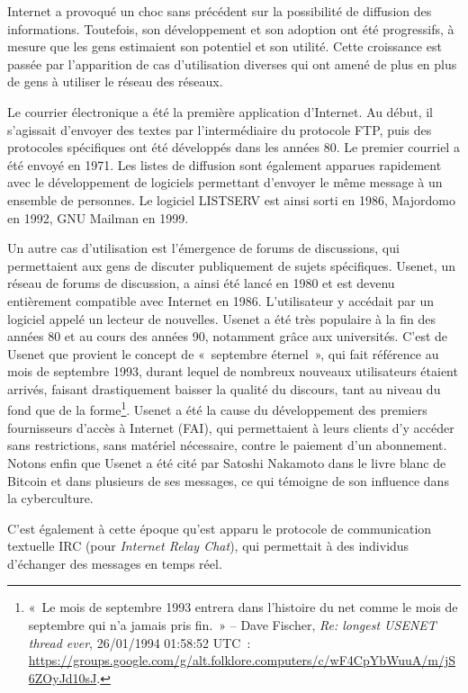 \documentclass[
  a5paper,
  smalldemyvopaper,10pt,twoside,onecolumn,openright,extrafontsizes,hidelinks]{memoir}
\begin{document}
Internet a provoqué un choc sans précédent sur la possibilité de
diffusion des informations. Toutefois, son développement et son adoption
ont été progressifs, à mesure que les gens estimaient son potentiel et
son utilité. Cette croissance est passée par l'apparition de cas
d'utilisation diverses qui ont amené de plus en plus de gens à utiliser
le réseau des réseaux.

Le courrier électronique a été la première application d'Internet. Au
début, il s'agissait d'envoyer des textes par l'intermédiaire du
protocole FTP, puis des protocoles spécifiques ont été développés dans
les années 80. Le premier courriel a été envoyé en 1971. Les listes de
diffusion sont également apparues rapidement avec le développement de
logiciels permettant d'envoyer le même message à un ensemble de
personnes. Le logiciel LISTSERV est ainsi sorti en 1986, Majordomo en
1992, GNU Mailman en 1999.

Un autre cas d'utilisation est l'émergence de forums de discussions, qui
permettaient aux gens de discuter publiquement de sujets spécifiques.
Usenet, un réseau de forums de discussion, a ainsi été lancé en 1980 et
est devenu entièrement compatible avec Internet en 1986. L'utilisateur y
accédait par un logiciel appelé un lecteur de nouvelles. Usenet a été
très populaire à la fin des années 80 et au cours des années 90,
notamment grâce aux universités. C'est de Usenet que provient le concept
de «~septembre éternel~», qui fait référence au mois de septembre 1993,
durant lequel de nombreux nouveaux utilisateurs étaient arrivés, faisant
drastiquement baisser la qualité du discours, tant au niveau du fond que
de la forme\footnote{«~Le mois de septembre 1993 entrera dans l'histoire
  du net comme le mois de septembre qui n'a jamais pris fin.~» -- Dave
  Fischer, \emph{Re: longest USENET thread ever}, 26/01/1994 01:58:52
  UTC~:
  \url{https://groups.google.com/g/alt.folklore.computers/c/wF4CpYbWuuA/m/jS6ZOyJd10sJ}.}.
Usenet a été la cause du développement des premiers fournisseurs d'accès
à Internet (FAI), qui permettaient à leurs clients d'y accéder sans
restrictions, sans matériel nécessaire, contre le paiement d'un
abonnement. Notons enfin que Usenet a été cité par Satoshi Nakamoto dans
le livre blanc de Bitcoin et dans plusieurs de ses messages, ce qui
témoigne de son influence dans la cyberculture.

C'est également à cette époque qu'est apparu le protocole de
communication textuelle IRC (pour \emph{Internet Relay Chat}), qui
permettait à des individus d'échanger des messages en temps réel.
\end{document}
